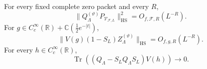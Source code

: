 \begin{proposition}
\label{hnew:natural-transfer-inputs}
For every fixed complete zero packet and every $R$,
\begin{equation}\label{hnew:natural-packets}
 \|Q_\Lambda^{(\vartheta)}P_{\mathcal V_{\mathcal F,L}}\|_{\mathrm{HS}}^2
                                             =O_{f,\mathcal F,R}(L^{-R}).
\end{equation}
For $g\in C_c^\infty(\mathbb R)+\mathbb C(\tfrac12e^{-|t|})$,
\begin{equation}\label{hnew:smoothed-leakage}
 \|V(g)(1-S_L)Z_\Lambda^{(\vartheta)}\|_{\mathrm{HS}}
                                                =O_{f,g,R}(L^{-R}).
\end{equation}
For every $h\in C_c^\infty(\mathbb R)$,
\begin{equation}\label{hnew:trace-transfer}
 \operatorname{Tr}((Q_\Lambda-S_LQ_\Lambda S_L)V(h))\longrightarrow0.
\end{equation}
\end{proposition}
